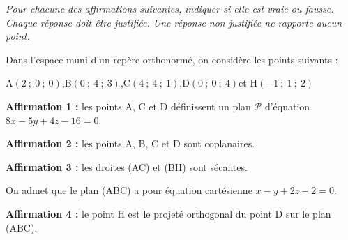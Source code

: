 \medskip

\emph{Pour chacune des affirmations suivantes, indiquer si elle est vraie ou fausse. Chaque réponse doit être justifiée. Une réponse non justifiée ne rapporte aucun point.}

\medskip

Dans l'espace muni d'un repère orthonormé, on considère les points suivants :

\begin{center}
	A$(2~;~0 ~;~0)$,\qquad B$(0 ~;~4~;~3)$,\qquad C$(4 ~;~4 ~;~1)$,\qquad D$(0 ~;~0 ~;~4)$\quad et \quad H$(-1~;~1~;~2)$
\end{center}

\smallskip

\textbf{Affirmation 1 :} les points A, C et D définissent un plan $\mathcal{P}$ d'équation $8 x- 5 y+ 4z - 16 = 0$.

\medskip

\textbf{Affirmation 2 :} les points A, B, C et D sont coplanaires.

\medskip

\textbf{Affirmation 3 :} les droites (AC) et (BH) sont sécantes.

\bigskip

On admet que le plan (ABC) a pour équation cartésienne $x - y + 2z - 2 = 0$.

\smallskip

\textbf{Affirmation 4 :} le point H est le projeté orthogonal du point D sur le plan (ABC).
